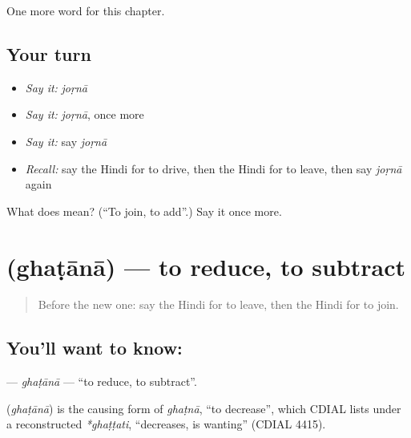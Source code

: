 \begin{grammarlens}[title={What you've built}]
One more word for this chapter.
\end{grammarlens}

\subsection*{Your turn}
\begin{itemize}
\raggedright
  \item \emph{Say it:} \emph{joṛnā}
  \item \emph{Say it:} \emph{joṛnā}, once more
  \item \emph{Say it:} say \emph{joṛnā}
  \item \emph{Recall:} say the Hindi for to drive, then the Hindi for to leave, then say \emph{joṛnā} again
\end{itemize}

\begin{tcolorbox}[breakable,colback=teal!4,colframe=teal!35!black,title={Before you move on}]
What does  mean? (\textquotedblleft{}To join, to add\textquotedblright{}.) Say it once more.
\end{tcolorbox}
\section[\texorpdfstring{\hi{घटाना} (ghaṭānā)}{घटाना (ghaṭānā)}]{ (ghaṭānā) — to reduce, to subtract}

\label{lesson:HI-C169-ghatana}



\begin{quote}
Before the new one: say the Hindi for to leave, then the Hindi for to join.
\end{quote}

\subsection*{You'll want to know: }
\textbf{} — \emph{ghaṭānā} — \textquotedblleft{}to reduce, to subtract\textquotedblright{}.

\begin{cousinweb}
\textbf{} (\emph{ghaṭānā}) is the causing form of \emph{ghaṭnā}, \textquotedblleft{}to decrease\textquotedblright{}, which CDIAL lists under a reconstructed \emph{*ghaṭṭati}, \textquotedblleft{}decreases, is wanting\textquotedblright{} (CDIAL 4415).
\end{cousinweb}

